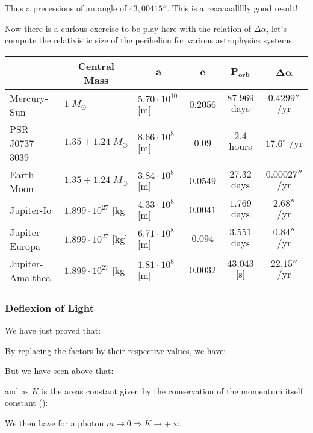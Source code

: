 	Thus a precessions of an angle of $43,00415''$. This is a reaaaaallllly good result!
	
	Now there is a curious exercise to be play here with the relation of $\Delta \alpha$, let's compute the relativistic size of the perihelion for various astrophysics systems.
	\begin{table}[H]
		\centering
		\begin{tabular}{|l|l|l|c|c|c|}
		\hline
		\rowcolor[HTML]{9B9B9B} 
		\multicolumn{1}{|c|}{\cellcolor[HTML]{9B9B9B}\textbf{System}} & \multicolumn{1}{c|}{\cellcolor[HTML]{9B9B9B}\textbf{Central Mass}} & \multicolumn{1}{c|}{\cellcolor[HTML]{9B9B9B}\textbf{$\pmb{a}$}} & \textbf{$\pmb{e}$} & \textbf{$\pmb{P_\text{orb}}$} & \textbf{$\pmb{\Delta \alpha}$} \\ \hline
		Mercury-Sun & $1\; M_{\odot}$ & $5.70\cdot 10^{10}$ [m] & $0.2056$ & $87.969$ days & $0.4299''$ /yr \\ \hline
		PSR J0737-3039 & $1.35+1.24\; M_{\odot}$ & $8.66\cdot 10^8$ [m] & $0.09$ & $2.4$ hours & $17.6^\circ$ /yr \\ \hline
		Earth-Moon & $1.35+1.24\; M_{\oplus}$ & $3.84\cdot 10^8$ [m] & $0.0549$ & $27.32$ days & $0.00027''$ /yr \\ \hline
		Jupiter-Io & $1.899 \cdot 10^{27}$ [kg] & $4.33\cdot 10^8$ [m] & $0.0041$ & $1.769$ days & $2.68''$ /yr \\ \hline
		Jupiter-Europa & $1.899 \cdot 10^{27}$ [kg] & $6.71\cdot 10^8$  [m] & $0.094$ & $3.551$ days & $0.84''$ /yr \\ \hline
		Jupiter-Amalthea & $1.899 \cdot 10^{27}$ [kg] & $1.81\cdot 10^8$  [m] & $0.0032$ & $43.043$ [s] & $22.15''$ /yr \\ \hline
		\end{tabular}
	\end{table}
	
	\subsubsection{Deflexion of Light}
	We have just proved that:
	
	By replacing the factors by their respective values, we have:
	
	But we have seen above that:
	
	and as $K$ is the areas constant given by the conservation of the momentum itself constant ():
	
	We then have for a photon $m\rightarrow 0\Rightarrow K\rightarrow +\infty$.
	
